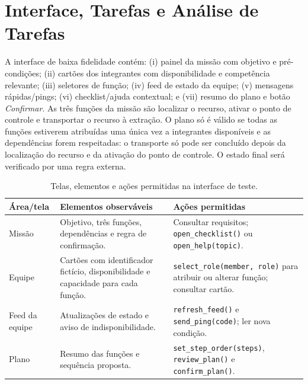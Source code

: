 \documentclass[conference]{IEEEtran}
\begin{document}
\section{Interface, Tarefas e Análise de Tarefas}
\label{sec:tarefas}

A interface de baixa fidelidade contém: (i) painel da missão com objetivo e pré-condições; (ii) cartões dos integrantes com disponibilidade e competência relevante; (iii) seletores de função; (iv) feed de estado da equipe; (v) mensagens rápidas/pings; (vi) checklist/ajuda contextual; e (vii) resumo do plano e botão \textit{Confirmar}. As três funções da missão são localizar o recurso, ativar o ponto de controle e transportar o recurso à extração. O plano só é válido se todas as funções estiverem atribuídas uma única vez a integrantes disponíveis e as dependências forem respeitadas: o transporte só pode ser concluído depois da localização do recurso e da ativação do ponto de controle. O estado final será verificado por uma regra externa.

\begin{table}[!t]
\centering
\caption{Telas, elementos e ações permitidas na interface de teste.}
\label{tab:interface}
\scriptsize
\renewcommand{\arraystretch}{1.08}
\begin{tabularx}{\columnwidth}{@{}p{1.45cm}Y Y@{}}
\toprule
\textbf{Área/tela} & \textbf{Elementos observáveis} & \textbf{Ações permitidas}
\\
\midrule
Missão & Objetivo, três funções, dependências e regra de confirmação. & Consultar requisitos; \texttt{open\_checklist()} ou \texttt{open\_help(topic)}. \\
Equipe & Cartões com identificador fictício, disponibilidade e capacidade para cada função. & \texttt{select\_role(member, role)} para atribuir ou alterar função; consultar cartão. \\
Feed da equipe & Atualizações de estado e aviso de indisponibilidade. & \texttt{refresh\_feed()} e \texttt{send\_ping(code)}; ler nova condição. \\
Plano & Resumo das funções e sequência proposta. & \texttt{set\_step\_order(steps)}, \texttt{review\_plan()} e \texttt{confirm\_plan()}. \\
\bottomrule
\end{tabularx}
\end{table}
\end{document}
